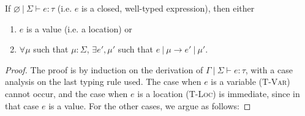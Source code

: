 \documentclass{llncs}
\begin{document}
\begin{theorem}[Progress]
If $\varnothing~|~\Sigma \vdash e : \tau$ (i.e. $e$ is a closed, well-typed expression), then either
\begin{enumerate}
\item $e$ is a value (i.e. a location) or
\item $\forall \mu$ such that $\mu : \Sigma$,
   $\exists e', \mu'$ such that $e~|~\mu \longrightarrow e'~|~\mu'$.
\end{enumerate}
\end{theorem}
\begin{proof} The proof is by induction on the derivation of $\Gamma~|~\Sigma \vdash e : \tau$, with a case analysis on the last typing rule used. The case when $e$ is a variable (\textsc{T-Var}) cannot occur, and the case when $e$ is a location (\textsc{T-Loc}) is immediate, since in that case $e$ is a value. For the other cases, we argue as follows:


\end{proof}
\end{document}
